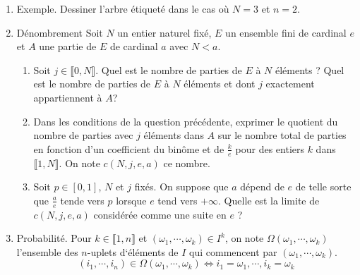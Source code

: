 \begin{enumerate}
  \item Exemple. Dessiner l'arbre étiqueté dans le cas où $N=3$ et $n=2$.

  \item Dénombrement\newline
Soit $N$ un entier naturel fixé, $E$ un ensemble fini de cardinal $e$ et $A$ une partie de $E$ de cardinal $a$ avec $N<a$.
\begin{enumerate}
  \item Soit $j\in \llbracket 0, N \rrbracket$. Quel est le nombre de parties de $E$ à $N$ éléments ? Quel est le nombre de parties de $E$ à $N$ éléments et dont $j$ exactement appartiennent à $A$?
  \item Dans les conditions de la question précédente, exprimer le quotient du nombre de parties avec $j$ éléments dans $A$ sur le nombre total de parties en fonction d'un coefficient du binôme et de $\frac{k}{e}$ pour des entiers $k$ dans $\llbracket 1,N\rrbracket$. On note $c(N,j,e,a)$ ce nombre.
  \item Soit $p\in [0,1]$, $N$ et  $j$ fixés. On suppose que $a$ dépend de $e$ de telle sorte que $\frac{a}{e}$ tende  vers $p$ lorsque $e$ tend vers $+\infty$. Quelle est la limite de $c(N,j,e,a)$ considérée comme une suite en $e$ ?
\end{enumerate}

  \item Probabilité.\newline
Pour $k\in \llbracket 1,n \rrbracket$ et $(\omega_1,\cdots,\omega_k)\in I^k$, on note $\Omega(\omega_1,\cdots,\omega_k)$ l'ensemble des $n$-uplets d`éléments de $I$ qui commencent par $(\omega_1,\cdots,\omega_k)$. 
\begin{displaymath}
  (i_1,\cdots,i_n)\in \Omega(\omega_1,\cdots,\omega_k) \Leftrightarrow i_1=\omega_1, \cdots, i_k = \omega_k
\end{displaymath}


\end{enumerate}
